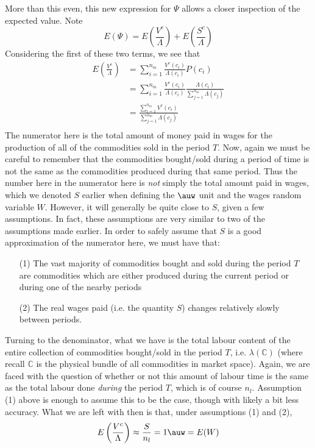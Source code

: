 \documentclass{article}
\theoremstyle{definition}
\theoremstyle{plain}
\theoremstyle{theorem}
\begin{document}
More than this even, this new expression for $\Psi$ allows a closer inspection of the expected value. Note
\[ E(\Psi) = E\left(\frac{V^c}{\Lambda}\right)+E\left(\frac{S^c}{\Lambda}\right) \]
Considering the first of these two terms, we see that
\begin{align}
	E\left(\frac{V^c}{\Lambda}\right) &= \sum_{i=1}^{n_m} \frac{V^c(c_i)}{\Lambda(c_i)}P(c_i) \\
		&= \sum_{i=1}^{n_m} \frac{V^c(c_i)}{\Lambda(c_i)}\frac{\Lambda(c_i)}{\sum_{j=1}^{n_m}\Lambda(c_j)} \\
		&= \frac{\sum_{i=1}^{n_m}V^c(c_i)}{\sum_{j=1}^{n_m}\Lambda(c_j)} \\
\end{align}
The numerator here is the total amount of money paid in wages for the production of all of the commodities sold in the period $T$. Now, again we must be careful to remember that the commodities bought/sold during a period of time is not the same as the commodities produced during that same period. Thus the number here in the numerator here is \textit{not} simply the total amount paid in wages, which we denoted $S$ earlier when defining the $\auw$ unit and the wages random variable $W$. However, it will generally be quite close to $S$, given a few assumptions. In fact, these assumptions are very similar to two of the assumptions  made earlier. In order to safely assume that $S$ is a good approximation of the numerator here, we must have that:
\begin{itemize}
	\item[(1)] The vast majority of commodities bought and sold during the period $T$ are commodities which are either produced during the current period or during one of the nearby periods
	\item[(2)] The real wages paid (i.e. the quantity $S$) changes relatively slowly between periods. 
\end{itemize}
Turning to the denominator, what we have is the total labour content of the entire collection of commodities bought/sold in the period $T$, i.e. $\lambda(\mathbb{C})$ (where recall $\mathbb{C}$ is the physical bundle of all commodities in market space). Again, we are faced with the question of whether or not this amount of labour time is the same as the total labour done \textit{during} the period $T$, which is of course $n_l$. Assumption (1) above is enough to assume this to be the case, though with likely a bit less accuracy. What we are left with then is that, under assumptions (1) and (2), 
\[ E\left(\frac{V^c}{\Lambda}\right) \approx \frac{S}{n_l} = 1\auw = E(W) \]
\end{document}
